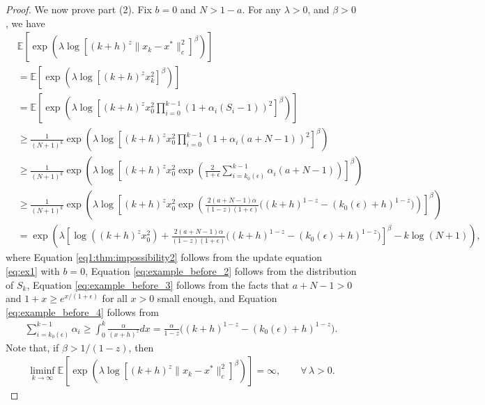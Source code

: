 \documentclass{article}
\begin{document}
\begin{proof}
We now prove part (2). Fix $b=0$ and $N>1-a$. For any $\lambda>0$, and $\beta>0$, we have
\begin{align}
    &\mathbb{E}\left[\exp\left(\lambda \log \left[(k+h)^{z} \| x_k -x^* \|^2_c \right]^\beta\right)\right] \nonumber \\
    & = \mathbb{E}\left[\exp\left(\lambda \log\left[(k+h)^{z} x_k^2 \right]^\beta\right)\right] \nonumber \\
    & = \mathbb{E}\left[\exp\left(\lambda \log \left[ (k+h)^z x_0^2 \prod_{i=0}^{k-1}(1+\alpha_i( S_i-1))^2 \right]^{\beta} \right) \right] \label{eq1:thm:impossibility2} \\
    & \geq \frac{1}{(N+1)^k}\exp\left(\lambda \log \left[ (k+h)^z  x_0^2 \prod_{i=0}^{k-1}(1+\alpha_i( a+N-1))^2 \right]^{\beta}  \right) \label{eq:example_before_2} \\
    & \geq \frac{1}{(N+1)^k} \exp\left(\lambda \log \left[ (k+h)^z  x_0^2 \exp\left( \frac{2}{1+\epsilon}\sum_{i=k_0(\epsilon)}^{k-1} \alpha_i(a+N-1) \right) \right]^{\beta}  \right) \label{eq:example_before_3} \\
    & \geq \frac{1}{(N+1)^k} \exp\left(\lambda \log \left[ (k+h)^z  x_0^2 \exp\left( \frac{2(a+N-1)\alpha}{(1-z)(1+\epsilon)} \Big((k+h)^{1-z}-(k_0(\epsilon)+h)^{1-z}\Big) \right) \right]^{\beta} \right) \label{eq:example_before_4} \\
    & = \exp\left(\lambda \left[ \log( (k+h)^z  x_0^2) +  \frac{2(a+N-1)\alpha}{(1-z)(1+\epsilon)}\Big((k+h)^{1-z}-(k_0(\epsilon)+h)^{1-z}\Big) \right]^{\beta}  - k \log(N+1) \right), \nonumber
\end{align}
where Equation \eqref{eq1:thm:impossibility2} follows from the update equation \eqref{eq:ex1} with $b=0$, Equation \eqref{eq:example_before_2} follows from the distribution of $S_k$, Equation \eqref{eq:example_before_3} follows from the facts that $a+N-1>0$ and $1+x\geq e^{x/(1+\epsilon)}$ for all $x>0$ small enough, and Equation \eqref{eq:example_before_4} follows from
\begin{align*}
    \sum_{i=k_0(\epsilon)}^{k-1}\alpha_i
    \geq \int_{0}^k\frac{\alpha}{(x+h)^z}dx
    = \frac{\alpha}{1-z}\Big((k+h)^{1-z}-(k_0(\epsilon)+h)^{1-z}\Big).
\end{align*}
Note that, if $\beta>1/(1-z)$, then
\begin{align*}
        \liminf\limits_{k\to\infty} \mathbb{E}\left[\exp\left(\lambda \log\left[(k+h)^{z} \|x_k-x^*\|_c^2\right]^\beta\right)\right] = \infty, \qquad \forall\,\lambda>0.
\end{align*}

\end{proof}
\end{document}
